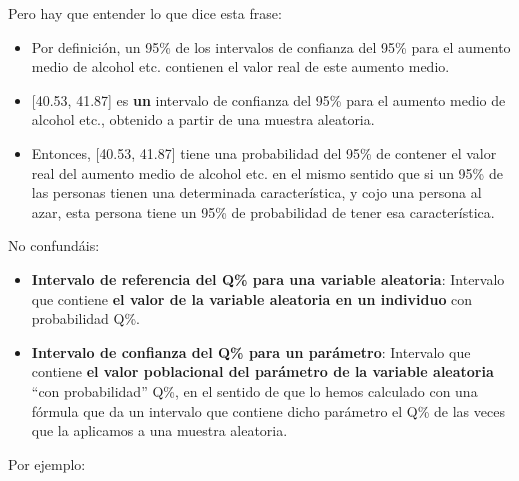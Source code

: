 \documentclass[
  spanish,
  letterpaper,
  DIV=11,
  numbers=noendperiod]{scrreprt}
\begin{document}
Pero hay que entender lo que dice esta frase:

\begin{itemize}
\item
  Por definición, un 95\% de los intervalos de confianza del 95\% para
  el aumento medio de alcohol etc. contienen el valor real de este
  aumento medio.
\item
  {[}40.53, 41.87{]} es \textbf{un} intervalo de confianza del 95\% para
  el aumento medio de alcohol etc., obtenido a partir de una muestra
  aleatoria.
\item
  Entonces, {[}40.53, 41.87{]} tiene una probabilidad del 95\% de
  contener el valor real del aumento medio de alcohol etc. en el mismo
  sentido que si un 95\% de las personas tienen una determinada
  característica, y cojo una persona al azar, esta persona tiene un 95\%
  de probabilidad de tener esa característica.
\end{itemize}

\begin{tcolorbox}[enhanced jigsaw, arc=.35mm, bottomrule=.15mm, bottomtitle=1mm, breakable, colback=white, colbacktitle=quarto-callout-warning-color!10!white, colframe=quarto-callout-warning-color-frame, coltitle=black, left=2mm, leftrule=.75mm, opacityback=0, opacitybacktitle=0.6, rightrule=.15mm, title=\textcolor{quarto-callout-warning-color}{\faExclamationTriangle}\hspace{0.5em}{Advertencia}, titlerule=0mm, toprule=.15mm, toptitle=1mm]

No confundáis:

\begin{itemize}
\item
  \textbf{Intervalo de referencia del Q\% para una variable aleatoria}:
  Intervalo que contiene \textbf{el valor de la variable aleatoria en un
  individuo} con probabilidad Q\%.
\item
  \textbf{Intervalo de confianza del Q\% para un parámetro}: Intervalo
  que contiene \textbf{el valor poblacional del parámetro de la variable
  aleatoria} ``con probabilidad'' Q\%, en el sentido de que lo hemos
  calculado con una fórmula que da un intervalo que contiene dicho
  parámetro el Q\% de las veces que la aplicamos a una muestra
  aleatoria.
\end{itemize}

\end{tcolorbox}

Por ejemplo:
\end{document}
